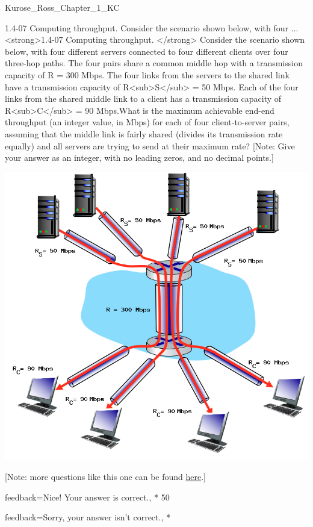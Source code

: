 \documentclass[a4paper]{article}
\begin{document}
\begin{quiz}{Kurose_Ross_Chapter_1_KC}
\begin{shortanswer}[
	points=1,
	penalty=0.33333,
]{1.4-07 Computing throughput.  Consider the scenario shown below, with four ...}
<strong>1.4-07 Computing throughput. </strong> Consider the scenario shown below, with four different servers connected to four different clients over four three-hop paths. The four pairs share a common middle hop with a transmission capacity of R = 300 Mbps. The four links from the servers to the shared link have a transmission capacity of R<sub>S</sub> = 50 Mbps. Each of the four links from the shared middle link to a client has a transmission capacity of R<sub>C</sub> = 90 Mbps.What is the maximum achievable end-end throughput (an integer value, in Mbps) for each of four client-to-server pairs, assuming that the middle link is fairly shared (divides its transmission rate equally) and all servers are trying to send at their maximum rate? [Note: Give your answer as an integer, with no leading zeros, and no decimal points.] 
\begin{center}
\includegraphics[width=\linewidth]{figs/1.4.7.png}
\end{center}
 [Note: more questions like this one can be found \href{http://gaia.cs.umass.edu/kurose_ross/interactive/end-end-throughput-simple.php}{here}.]
\item[feedback={Nice!  Your answer is correct.},]* 50
\item[feedback={Sorry, your answer isn't correct.},] *
\end{shortanswer}


\end{quiz}
\end{document}
